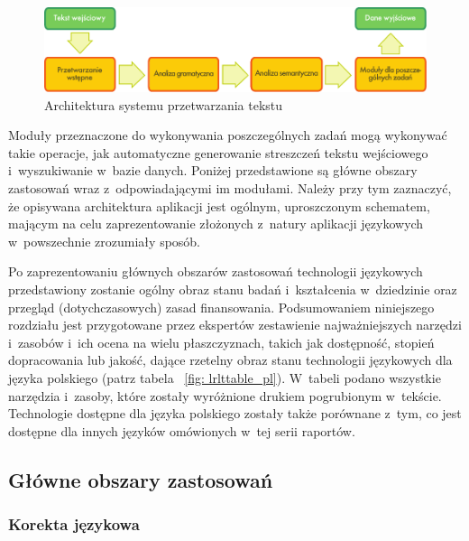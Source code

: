 \begin{multicols}{2}
\begin{figure}[b]  \center
\includegraphics[width=\textwidth]{../_media/polish/text_processing_app_architecture}
\caption{Architektura systemu przetwarzania tekstu} \label{fig:
textprocessingarch_pl} 
\end{figure} 

Moduły przeznaczone do wykonywania poszczególnych zadań mogą
wykonywać takie operacje, jak automatyczne generowanie streszczeń
tekstu wejściowego i~wyszukiwanie w~bazie danych. Poniżej
przedstawione są główne obszary zastosowań wraz z~odpowiadającymi
im modułami. Należy przy tym zaznaczyć, że opisywana architektura
aplikacji jest ogólnym, uproszczonym schematem, mającym na celu
zaprezentowanie złożonych z~natury aplikacji językowych
w~powszechnie zrozumiały sposób. 

Po zaprezentowaniu głównych obszarów zastosowań technologii
językowych przedstawiony zostanie ogólny obraz stanu badań
i~kształcenia w~dziedzinie oraz przegląd (dotychczasowych) zasad
finansowania. Podsumowaniem niniejszego rozdziału jest przygotowane
przez ekspertów zestawienie najważniejszych narzędzi i~zasobów
i~ich ocena na wielu płaszczyznach, takich jak dostępność,
stopień dopracowania lub jakość, dające rzetelny obraz stanu
technologii językowych dla języka polskiego (patrz tabela ~\ref{fig:
lrlttable_pl}). W~tabeli podano wszystkie narzędzia i~zasoby, które
zostały wyróżnione drukiem pogrubionym w~tekście. Technologie
dostępne dla języka polskiego zostały także porównane z~tym, co
jest dostępne dla innych języków omówionych w~tej serii raportów. 

\subsection[Główne obszary zastosowań]{Główne obszary
zastosowań} 

\subsubsection[Korekta językowa]{Korekta językowa} 


\end{multicols}
